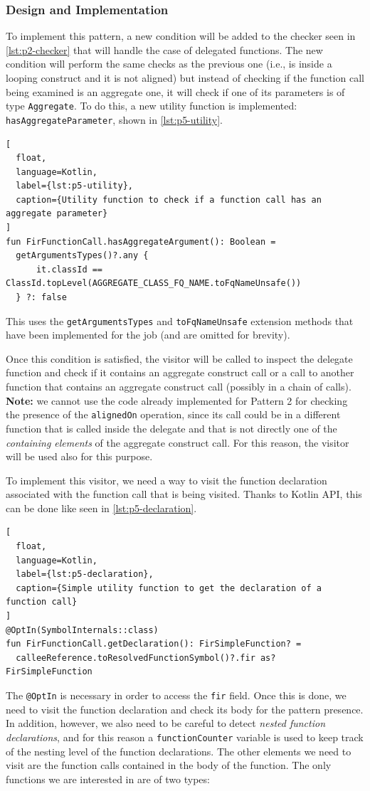 \documentclass[12pt,a4paper,openright,twoside]{book}
\begin{document}
\subsubsection{Design and Implementation}

To implement this pattern, a new condition will be added to the checker seen in
\cref{lst:p2-checker} that will handle the case of delegated functions. The new
condition will perform the same checks as the previous one (i.e., is inside a
looping construct and it is not aligned) but instead of checking if the function
call being examined is an aggregate one, it will check if one of its parameters
is of type \lstinline{Aggregate}. To do this, a new utility function is
implemented: \lstinline{hasAggregateParameter}, shown in \cref{lst:p5-utility}.
%
\begin{lstlisting}[
  float, 
  language=Kotlin,
  label={lst:p5-utility},
  caption={Utility function to check if a function call has an aggregate parameter}
]
fun FirFunctionCall.hasAggregateArgument(): Boolean =
  getArgumentsTypes()?.any {
      it.classId == ClassId.topLevel(AGGREGATE_CLASS_FQ_NAME.toFqNameUnsafe())
  } ?: false 
\end{lstlisting}
%
This uses the \lstinline{getArgumentsTypes} and \lstinline{toFqNameUnsafe}
extension methods that have been implemented for the job (and are omitted for
brevity). 

Once this condition is satisfied, the visitor will be called to
inspect the delegate function and check if it contains an aggregate construct
call or a call to another function that contains an aggregate construct call
(possibly in a chain of calls). \textbf{Note:} we cannot use the code already
implemented for Pattern 2 for checking the presence of the \lstinline{alignedOn}
operation, since its call could be in a different function that is called inside
the delegate and that is not directly one of the \emph{containing elements} of
the aggregate construct call. For this reason, the visitor will be used also for
this purpose.

To implement this visitor, we need a way to visit the function declaration
associated with the function call that is being visited. Thanks to Kotlin API,
this can be done like seen in \cref{lst:p5-declaration}.
%
\begin{lstlisting}[
  float, 
  language=Kotlin,
  label={lst:p5-declaration},
  caption={Simple utility function to get the declaration of a function call}
]
@OptIn(SymbolInternals::class)
fun FirFunctionCall.getDeclaration(): FirSimpleFunction? =
  calleeReference.toResolvedFunctionSymbol()?.fir as? FirSimpleFunction
\end{lstlisting}
%
The \lstinline{@OptIn} is necessary in order to access the \lstinline{fir}
field. Once this is done, we need to visit the function declaration and check
its body for the pattern presence. In addition, however, we also need to be
careful to detect \emph{nested function declarations}, and for this reason 
a \lstinline{functionCounter} variable is used to keep track of the nesting
level of the function declarations. 
%
The other elements we need to visit are the function calls contained in the body
of the function. The only functions we are interested in are of two types:
\end{document}
